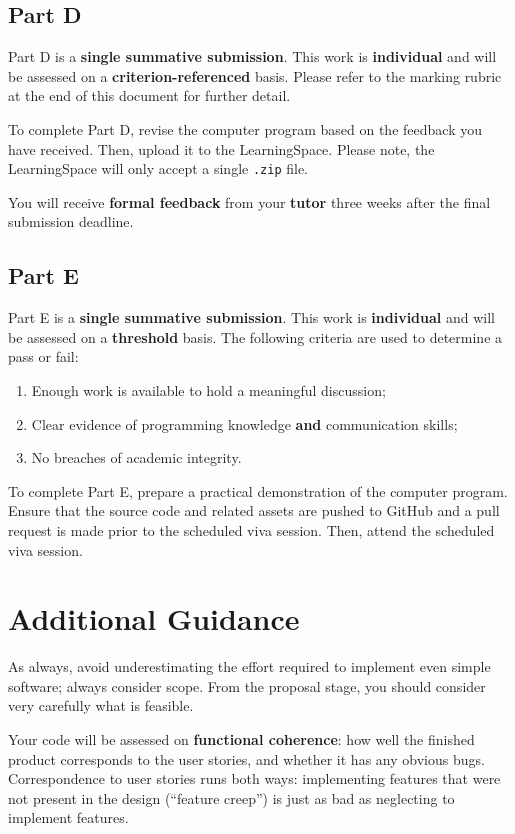\documentclass{../../fal_assignment}
\begin{document}
\subsection*{Part D}

Part D is a \textbf{single summative submission}. This work is \textbf{individual} and will be assessed on a \textbf{criterion-referenced} basis. Please refer to the marking rubric at the end of this document for further detail.

To complete Part D, revise the computer program based on the feedback you have received. Then, upload it to the LearningSpace. Please note, the LearningSpace will only accept a single \texttt{.zip} file.

You will receive \textbf{formal feedback} from your \textbf{tutor} three weeks after the final submission deadline.

\subsection*{Part E}

Part E is a \textbf{single summative submission}. This work is \textbf{individual} and will be assessed on a \textbf{threshold} basis.  The following criteria are used to determine a pass or fail:

\begin{enumerate}[label=(\alph*)]
	\item Enough work is available to hold a meaningful discussion;
	\item Clear evidence of programming knowledge \textbf{and} communication skills;
	\item No breaches of academic integrity.
\end{enumerate}

To complete Part E, prepare a practical demonstration of the computer program. Ensure that the source code and related assets are pushed to GitHub and a pull request is made prior to the scheduled viva session. Then, attend the scheduled viva session.

\section*{Additional Guidance}

As always, avoid underestimating the effort required to implement even simple software; always consider scope.
From the proposal stage, you should consider very carefully what is feasible.

Your code will be assessed on \textbf{functional coherence}:
how well the finished product corresponds to the user stories,
and whether it has any obvious bugs.
Correspondence to user stories runs both ways:
implementing features that were not present in the design (``feature creep'')
is just as bad as neglecting to implement features.
\end{document}
